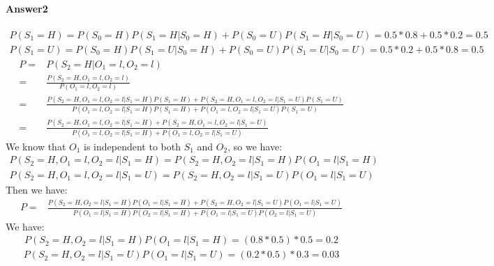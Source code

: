 \documentclass[paper=a4, fontsize=11pt]{scrartcl} %
\numberwithin{equation}{section} %
\numberwithin{figure}{section} %
\numberwithin{table}{section} %
\begin{document}
\paragraph{\textbf{Answer2}}
\begin{align*}
P\left ( S_{1}=H \right )=P\left ( S_{0}=H \right )P\left ( S_{1}=H|S_{0}=H \right )+P\left ( S_{0}=U\right )P\left ( S_{1}=H|S_{0}=U \right )=0.5*0.8+0.5*0.2=0.5
\end{align*}
\begin{align*}
P\left ( S_{1}=U \right )=P\left ( S_{0}=H \right )P\left ( S_{1}=U|S_{0}=H \right )+P\left ( S_{0}=U\right )P\left ( S_{1}=U|S_{0}=U \right )=0.5*0.2+0.5*0.8=0.5
\end{align*}
\begin{align*}
P=&P\left ( S_{2}=H|O_{1}=l,O_{2}=l \right )
\\=&\frac{P\left ( S_{2}=H,O_{1}=l,O_{2}=l \right )}{P\left ( O_{1}=l,O_{2}=l \right )}
\\=&\frac{P\left ( S_{2}=H,O_{1}=l,O_{2}=l | S_{1}=H \right )P\left ( S_{1}=H \right )+P\left ( S_{2}=H,O_{1}=l,O_{2}=l | S_{1}=U \right )P\left ( S_{1}=U \right )}{P\left ( O_{1}=l,O_{2}=l | S_{1}=H \right )P\left ( S_{1}=H \right )+P\left ( O_{1}=l,O_{2}=l | S_{1}=U \right )P\left ( S_{1}=U \right )}
\\=&\frac{P\left ( S_{2}=H,O_{1}=l,O_{2}=l | S_{1}=H \right )+P\left ( S_{2}=H,O_{1}=l,O_{2}=l | S_{1}=U \right )}{P\left ( O_{1}=l,O_{2}=l | S_{1}=H \right )+P\left ( O_{1}=l,O_{2}=l | S_{1}=U \right )}
\end{align*}
We know that $O_{1}$ is independent to both $S_{1}$ and $O_{2}$, so we have:
\begin{align*}
P\left ( S_{2}=H,O_{1}=l,O_{2}=l | S_{1}=H \right ) = P\left ( S_{2}=H,O_{2}=l | S_{1}=H \right )P\left ( O_{1}=l | S_{1}=H \right )
\end{align*}
\begin{align*}
P\left ( S_{2}=H,O_{1}=l,O_{2}=l | S_{1}=U \right ) = P\left ( S_{2}=H,O_{2}=l | S_{1}=U \right )P\left ( O_{1}=l | S_{1}=U \right )
\end{align*}
Then we have:
\begin{align*}
P=&\frac{P\left ( S_{2}=H,O_{2}=l | S_{1}=H \right )P\left ( O_{1}=l | S_{1}=H \right )+P\left ( S_{2}=H,O_{2}=l | S_{1}=U \right )P\left ( O_{1}=l | S_{1}=U \right )}{P\left ( O_{1}=l | S_{1}=H \right )P\left ( O_{2}=l | S_{1}=H \right )+P\left ( O_{1}=l | S_{1}=U \right )P\left ( O_{2}=l | S_{1}=U \right )}
\end{align*}
We have:
\begin{align*}
P\left ( S_{2}=H,O_{2}=l | S_{1}=H \right )P\left ( O_{1}=l | S_{1}=H \right )=\left ( 0.8*0.5 \right )*0.5=0.2
\end{align*}
\begin{align*}
P\left ( S_{2}=H,O_{2}=l | S_{1}=U \right )P\left ( O_{1}=l | S_{1}=U \right )=\left ( 0.2*0.5 \right )*0.3=0.03
\end{align*}
\end{document}
